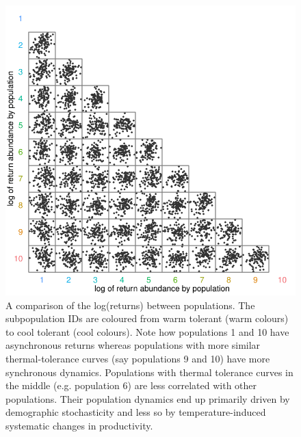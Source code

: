 \begin{figure}[htbp]
\centering
\includegraphics[width=4.5in]{metafolio/example-return-correlations}
\caption[A comparison of the log(returns) between populations.]{A comparison of the log(returns) between populations. The
subpopulation IDs are coloured from warm tolerant (warm colours) to cool
tolerant (cool colours). Note how populations 1 and 10 have asynchronous
returns whereas populations with more similar thermal-tolerance curves (say
populations 9 and 10) have more synchronous dynamics. Populations with
thermal tolerance curves in the middle (e.g. population 6) are less
correlated with other populations. Their population dynamics end up primarily
driven by demographic stochasticity and less so by temperature-induced
systematic changes in productivity.}
\label{f:ret-corr}
\end{figure}

\clearpage


